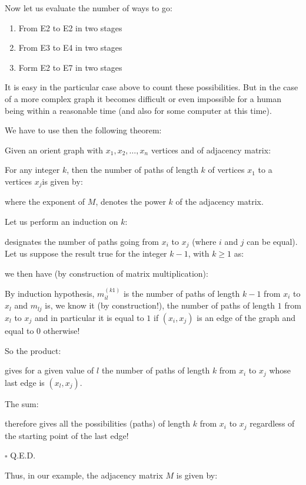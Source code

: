 {	Now let us evaluate the number of ways to go:
	\begin{enumerate}
		\item From E2 to E2 in two stages
		\item From E3 to E4 in two stages
		\item Form E2 to E7 in two stages
	\end{enumerate}
	It is easy in the particular case above to count these possibilities. But in the case of a more complex graph it becomes difficult or even impossible for a human being within a reasonable time (and also for some computer at this time).
	
	We have to use then the following theorem:
	\begin{theorem}
	Given an orient graph with $x_1,x_2,\ldots, x_n$ vertices and of adjacency matrix:
	
	For any integer $k$, then the number of paths of length $k$ of vertices $x_1$ to a vertices $x_j$is given by:
	
	where the exponent of $M$, denotes the power $k$ of the adjacency matrix.
	\end{theorem}
	\begin{dem}
	Let us perform an induction on $k$:
	
	designates the number of paths going from $x_i$ to $x_j$ (where $i$ and $j$ can be equal). Let us suppose the result true for the integer $k-1$, with $k\geq 1$ as:
	
	we then have (by construction of matrix multiplication):
	
	By induction hypothesis, $m_{il}^{(k­1)}$ is the number of paths of length $k-1$ from $x_i$ to $x_l$ and $m_{lj}$ is, we know it (by construction!), the number of paths of length $1$ from $x_l$ to $x_j$ and in particular it is equal to $1$ if $(x_i,x_j)$ is an edge of the graph and equal to $0$ otherwise!
	
	So the product:
	
	gives for a given value of $l$ the number of paths of length $k$ from $x_i$ to $x_j$ whose last edge is $(x_l,x_j)$.

	The sum:
	
	therefore gives all the possibilities (paths) of length $k$ from $x_i$ to $x_j$ regardless of the starting point of the last edge!
	\begin{flushright}
		$\square$  Q.E.D.
	\end{flushright}
	\end{dem}
	Thus, in our example, the adjacency matrix $M$ is given by:
	
}
